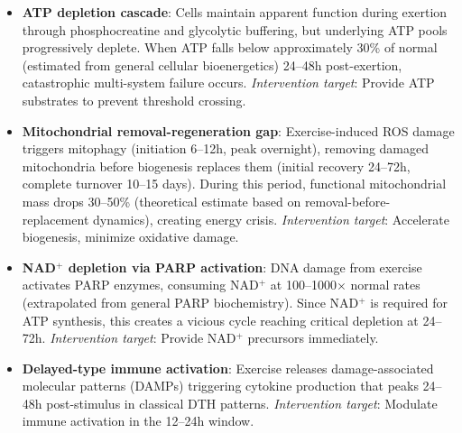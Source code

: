 \begin{itemize}
    \item \textbf{ATP depletion cascade}: Cells maintain apparent function during exertion through phosphocreatine and glycolytic buffering, but underlying ATP pools progressively deplete. When ATP falls below approximately 30\% of normal (estimated from general cellular bioenergetics) 24--48h post-exertion, catastrophic multi-system failure occurs. \textit{Intervention target}: Provide ATP substrates to prevent threshold crossing.

    \item \textbf{Mitochondrial removal-regeneration gap}: Exercise-induced ROS damage triggers mitophagy (initiation 6--12h, peak overnight), removing damaged mitochondria before biogenesis replaces them (initial recovery 24--72h, complete turnover 10--15 days). During this period, functional mitochondrial mass drops 30--50\% (theoretical estimate based on removal-before-replacement dynamics), creating energy crisis. \textit{Intervention target}: Accelerate biogenesis, minimize oxidative damage.

    \item \textbf{NAD$^+$ depletion via PARP activation}: DNA damage from exercise activates PARP enzymes, consuming NAD$^+$ at 100--1000$\times$ normal rates (extrapolated from general PARP biochemistry). Since NAD$^+$ is required for ATP synthesis, this creates a vicious cycle reaching critical depletion at 24--72h. \textit{Intervention target}: Provide NAD$^+$ precursors immediately.

    \item \textbf{Delayed-type immune activation}: Exercise releases damage-associated molecular patterns (DAMPs) triggering cytokine production that peaks 24--48h post-stimulus in classical DTH patterns. \textit{Intervention target}: Modulate immune activation in the 12--24h window.
\end{itemize}

